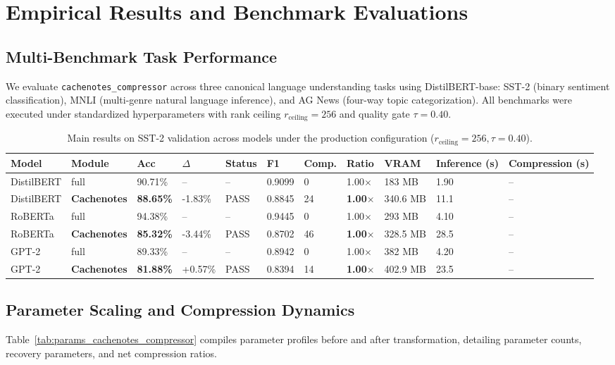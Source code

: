 \section{Empirical Results and Benchmark Evaluations}
\label{sec:results}

\subsection{Multi-Benchmark Task Performance}
We evaluate \texttt{cachenotes\_compressor} across three canonical language understanding tasks using DistilBERT-base: SST-2 (binary sentiment classification), MNLI (multi-genre natural language inference), and AG News (four-way topic categorization). All benchmarks were executed under standardized hyperparameters with rank ceiling $r_{\mathrm{ceiling}} = 256$ and quality gate $\tau = 0.40$.

\begin{table}[t]
\centering
\small
\begin{tabular}{lllllllllll}
\toprule
\textbf{Model} & \textbf{Module} & \textbf{Acc} & \textbf{$\Delta$} & \textbf{Status} & \textbf{F1} & \textbf{Comp.} & \textbf{Ratio} & \textbf{VRAM} & \textbf{Inference (s)} & \textbf{Compression (s)} \\
\midrule
DistilBERT & full & 90.71\% & -- & -- & 0.9099 & 0 & 1.00$\times$ & 183 MB & 1.90 & -- \\
DistilBERT & \textbf{Cachenotes} & \textbf{88.65\%} & -1.83\% & PASS & 0.8845 & 24 & \textbf{1.00$\times$} & 340.6 MB & 11.1 & -- \\
RoBERTa & full & 94.38\% & -- & -- & 0.9445 & 0 & 1.00$\times$ & 293 MB & 4.10 & -- \\
RoBERTa & \textbf{Cachenotes} & \textbf{85.32\%} & -3.44\% & PASS & 0.8702 & 46 & \textbf{1.00$\times$} & 328.5 MB & 28.5 & -- \\
GPT-2 & full & 89.33\% & -- & -- & 0.8942 & 0 & 1.00$\times$ & 382 MB & 4.20 & -- \\
GPT-2 & \textbf{Cachenotes} & \textbf{81.88\%} & +0.57\% & PASS & 0.8394 & 14 & \textbf{1.00$\times$} & 402.9 MB & 23.5 & -- \\
\bottomrule
\end{tabular}
\caption{Main results on SST-2 validation across models under the production configuration ($r_{\mathrm{ceiling}}=256, \tau=0.40$).}
\label{tab:main_sst2}
\end{table}

\subsection{Parameter Scaling and Compression Dynamics}
Table~\ref{tab:params_cachenotes_compressor} compiles parameter profiles before and after transformation, detailing parameter counts, recovery parameters, and net compression ratios.

